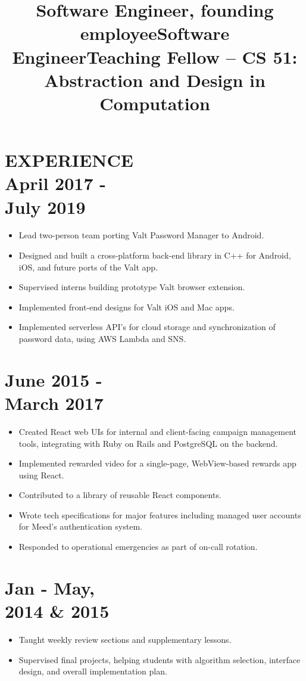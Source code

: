 \documentclass[centered, margin, 11pt]{res} %
\newcommand\mainsectionfont{\fontsize{10.5pt}{14pt}\selectfont\bf\textup}
\newcommand\subsectionfont{\small\textmd\textup}
\renewcommand\sectionfont{\mainsectionfont} %
\renewcommand\dates{\section} %
\newenvironment{rlist}
    {\begin{minipage}[t]{\linewidth}\begin{itemize}\raggedright}
    {\end{itemize}\end{minipage}}
\newenvironment{positionlist}
    {\begin{position}\begin{rlist}}
    {\end{rlist}\end{position}}
\begin{document}
\begin{resume}
\renewcommand\sectionfont{\subsectionfont} %

\section{{\mainsectionfont EXPERIENCE} \\ April 2017 - \\ July 2019 }
\title{Software Engineer, founding employee}
\begin{positionlist}
  \item Lead two-person team porting Valt Password Manager to Android.
  \item Designed and built a cross-platform back-end library in C++ for
    Android, iOS, and future ports of the Valt app.
  \item Supervised interns building prototype Valt browser extension.
  \item Implemented front-end designs for Valt iOS and Mac apps.
  \item Implemented serverless API's for cloud storage and synchronization
    of password data, using AWS Lambda and SNS.
\end{positionlist}

\title{Software Engineer}
\dates{June 2015 - \\ March 2017}
\begin{positionlist}
  \item Created React web UIs for internal and client-facing
    campaign management tools, integrating with Ruby on Rails
    and PostgreSQL on the backend.
  \item Implemented rewarded video for a single-page, WebView-based
    rewards app using React.
  \item Contributed to a library of reusable React components.
  \item Wrote tech specifications for major features including managed user
    accounts for Meed's authentication system.
  \item Responded to operational emergencies as part of on-call rotation.
\end{positionlist}

\title{Teaching Fellow -- CS 51: Abstraction and Design in Computation}
\dates{Jan - May, \\ 2014 \& 2015}
\begin{positionlist}
  \item Taught weekly review sections and supplementary lessons.
  \item Supervised final projects, helping students with algorithm selection,
    interface design, and overall implementation plan.
\end{positionlist}


\end{resume}
\end{document}

